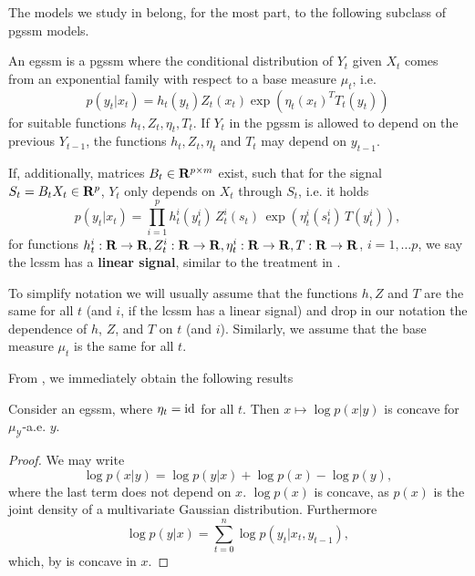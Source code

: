 The models we study in  belong, for the most part,  to the following subclass of \acrshort{pgssm} models.
\begin{definition}
    \label{def:lcssm}
    An \acrfull{egssm} is a \acrshort{pgssm} where the conditional distribution of $Y_{t}$ given $X_{t}$ comes from an exponential family with respect to a base measure $\mu_{t}$, i.e.
    $$
    p (y_{t}|x_{t}) = h_{t}(y_{t}) Z_{t}(x_{t}) \exp \left( \eta_{t}(x_{t})^{T} T_{t}(y_{t}) \right)
    $$
    for suitable functions $h_{t}, Z_{t}, \eta_{t}, T_{t}$. If $Y_{t}$ in the \acrshort{pgssm} is allowed to depend on the previous $Y_{t - 1}$, the functions $h_{t}, Z_{t}, \eta_{t}$ and $T_{t}$ may depend on $y_{t - 1}$. 

    If, additionally, matrices $B_{t} \in \mathbf R^{p \times m}$ exist, such that for the signal $S_{t} = B_{t}X_{t} \in \mathbf R^{p}$, $Y_{t}$ only depends on $X_{t}$ through $S_{t}$, i.e. it holds
    $$
    p(y_{t}|x_{t}) = \prod_{i = 1}^p h^{i}_{t}(y^{i}_{t})\, Z^{i}_{t} (s_{t})\, \exp \left( \eta^{i}_{t} (s^{i}_{t})\,T(y^{i}_{t}) \right),
    $$
    for functions $h_{t}^{i}: \mathbf R \to \mathbf R, Z^{i}_{t}: \mathbf R \to \mathbf R, \eta^{i}_{t}: \mathbf R\to\mathbf R, T: \mathbf R\to\mathbf R$, $i = 1, \dots p$, we say the \gls{lcssm} has a \textbf{linear signal}, similar to the treatment in \citep[Part II]{Durbin2012Time}.
\end{definition}

\begin{remark}
    To simplify notation we will usually assume that the functions $h, Z$ and $T$ are the same for all $t$ (and $i$, if the \gls{lcssm} has a linear signal) and drop in our notation the dependence of $h$, $Z$, and $T$ on $t$ (and $i$). Similarly, we assume that the base measure $\mu_t$ is the same for all $t$.
\end{remark}

From , we immediately obtain the following results \citep[Section 10.6.4]{Durbin2012Time}
\begin{lemma}
    Consider an \acrshort{egssm}, where $\eta_{t} = \operatorname{id}$ for all $t$.  Then $x \mapsto \log p(x|y)$ is concave for $\mu_{\mathcal Y}$-a.e. $y$. 
\end{lemma}
\begin{proof}
    We may write
    $$
    \log p(x|y) = \log p(y|x) + \log p(x) - \log p(y),
    $$
    where the last term does not depend on $x$. $\log p(x)$ is concave, as $p(x)$ is the joint density of a multivariate Gaussian distribution. Furthermore 
    $$
    \log p(y | x) = \sum_{t = 0}^n \log p(y_{t} | x_{t}, y_{t - 1}),
    $$
    which, by  is concave in $x$. 
\end{proof}

